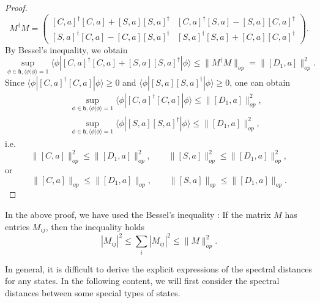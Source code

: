 \documentclass[a4paper,11pt]{article}
\begin{document}
\begin{proof}
\begin{equation}
    M^{\dag} M = \left( \begin{array}{cc}
      {}[C, a]^{\dag} [C, a] + [S, a] [S, a]^{\dag} & [C, a]^{\dag} [S, a] -
      [S, a] [C, a]^{\dag}\\
      {}[S, a]^{\dag} [C, a] - [C, a] [S, a]^{\dag} & [S, a]^{\dag} [S, a] +
      [C, a] [C, a]^{\dag}
    \end{array} \right) .
  \end{equation}
  By Bessel's inequality, we obtain
  \begin{equation}
    \sup_{\phi \in \mathfrak{h}, \langle \phi | \phi \rangle = 1}
    \!\!\!\!\! \langle \phi | [C, a]^{\dag} [C, a] +
    [S, a] [S, a]^{\dag} | \phi \rangle \leqslant \|M^{\dag} M\|_{op} =
     \|[D_1, a]\|_{op}^2 .
  \end{equation}
  Since $\langle \phi | [C, a]^{\dag} [C, a] | \phi \rangle \geqslant 0$ and
  $\langle \phi | [S, a] [S, a]^{\dag} | \phi \rangle \geqslant 0$, one can
  obtain
  \begin{eqnarray}
   && \sup_{\phi \in \mathfrak{h}, \langle \phi | \phi \rangle = 1}
    \!\!\!\!\! \langle \phi | [C, a]^{\dag} [C, a] |
    \phi \rangle \leqslant \|[D_1, a]\|_{op}^2,
\nonumber\\
   && \sup_{\phi \in \mathfrak{h}, \langle \phi | \phi \rangle = 1}
    \!\!\!\!\! \langle \phi | [S, a] [S, a]^{\dag} |
    \phi \rangle \leqslant \|[D_1, a]\|_{op}^2,
  \end{eqnarray}
  i.e.
  \begin{equation}
    \|[C, a]\|_{op}^2 \leqslant \|[D_1, a]\|_{op}^2, \qquad \|[S,
    a]\|_{op}^2 \leqslant \|[D_1, a]\|_{op}^2,
  \end{equation}
  or
  \begin{equation}
    \|[C, a]\|_{op} \leqslant \|[D_1, a]\|_{op}, \qquad
    \|[S, a]\|_{op} \leqslant \|[D_1, a]\|_{op} .
  \end{equation}
\end{proof}

In the above proof, we have used the Bessel's inequality \cite{Revisiting}: If the matrix
$M$ has entries $ M_{ij}$, then the inequality holds
\begin{equation}
  | M_{ij} |^2 \leqslant \sum_i | M_{ij} |^2 \leqslant \|M\|_{op}^2 .
\end{equation}

In general, it is difficult to derive the explicit expressions of the spectral distances for any states.
In the following content, we will first consider the spectral distances between some special types of states.
\end{document}
